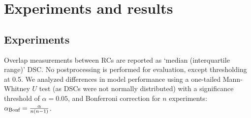 \section{Experiments and results}
\label{sec:experiments_and_results}






\subsection{Experiments}

Overlap measurements between \acp{RC} are reported as `median (interquartile range)' \acf{DSC}.
No postprocessing is performed for evaluation, except thresholding at 0.5.
We analyzed differences in model performance using a one-tailed Mann-Whitney $U$ test (as \acp{DSC} were not normally distributed) with a significance threshold of $\alpha = 0.05$, and Bonferroni correction for $n$ experiments: $\alpha_{\text{Bonf}} = \frac{\alpha}{n (n - 1)}$.







